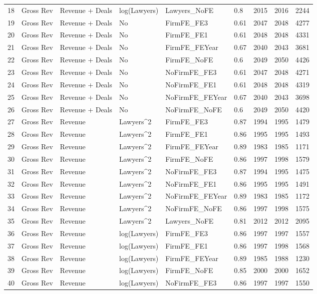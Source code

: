 \begin{table}[ht]
\begin{tabular}{rllllllll}
  18 & Gross Rev & Revenue + Deals & log(Lawyers) & Lawyers\_NoFE & 0.8 & 2015 & 2016 & 2244 \\ 
  19 & Gross Rev & Revenue + Deals & No & FirmFE\_FE3 & 0.61 & 2047 & 2048 & 4277 \\ 
  20 & Gross Rev & Revenue + Deals & No & FirmFE\_FE1 & 0.61 & 2048 & 2048 & 4331 \\ 
  21 & Gross Rev & Revenue + Deals & No & FirmFE\_FEYear & 0.67 & 2040 & 2043 & 3681 \\ 
  22 & Gross Rev & Revenue + Deals & No & FirmFE\_NoFE & 0.6 & 2049 & 2050 & 4426 \\ 
  23 & Gross Rev & Revenue + Deals & No & NoFirmFE\_FE3 & 0.61 & 2047 & 2048 & 4271 \\ 
  24 & Gross Rev & Revenue + Deals & No & NoFirmFE\_FE1 & 0.61 & 2048 & 2048 & 4319 \\ 
  25 & Gross Rev & Revenue + Deals & No & NoFirmFE\_FEYear & 0.67 & 2040 & 2043 & 3698 \\ 
  26 & Gross Rev & Revenue + Deals & No & NoFirmFE\_NoFE & 0.6 & 2049 & 2050 & 4420 \\ 
  27 & Gross Rev & Revenue & Lawyers^2 & FirmFE\_FE3 & 0.87 & 1994 & 1995 & 1479 \\ 
  28 & Gross Rev & Revenue & Lawyers^2 & FirmFE\_FE1 & 0.86 & 1995 & 1995 & 1493 \\ 
  29 & Gross Rev & Revenue & Lawyers^2 & FirmFE\_FEYear & 0.89 & 1983 & 1985 & 1171 \\ 
  30 & Gross Rev & Revenue & Lawyers^2 & FirmFE\_NoFE & 0.86 & 1997 & 1998 & 1579 \\ 
  31 & Gross Rev & Revenue & Lawyers^2 & NoFirmFE\_FE3 & 0.87 & 1994 & 1995 & 1475 \\ 
  32 & Gross Rev & Revenue & Lawyers^2 & NoFirmFE\_FE1 & 0.86 & 1995 & 1995 & 1491 \\ 
  33 & Gross Rev & Revenue & Lawyers^2 & NoFirmFE\_FEYear & 0.89 & 1983 & 1985 & 1172 \\ 
  34 & Gross Rev & Revenue & Lawyers^2 & NoFirmFE\_NoFE & 0.86 & 1997 & 1998 & 1575 \\ 
  35 & Gross Rev & Revenue & Lawyers^2 & Lawyers\_NoFE & 0.81 & 2012 & 2012 & 2095 \\ 
  36 & Gross Rev & Revenue & log(Lawyers) & FirmFE\_FE3 & 0.86 & 1997 & 1997 & 1557 \\ 
  37 & Gross Rev & Revenue & log(Lawyers) & FirmFE\_FE1 & 0.86 & 1997 & 1998 & 1568 \\ 
  38 & Gross Rev & Revenue & log(Lawyers) & FirmFE\_FEYear & 0.89 & 1985 & 1988 & 1230 \\ 
  39 & Gross Rev & Revenue & log(Lawyers) & FirmFE\_NoFE & 0.85 & 2000 & 2000 & 1652 \\ 
  40 & Gross Rev & Revenue & log(Lawyers) & NoFirmFE\_FE3 & 0.86 & 1997 & 1997 & 1550 \\ 
   \hline
\end{tabular}
\end{table}

